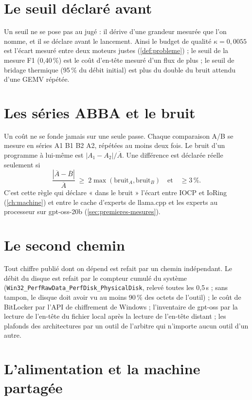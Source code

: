 \section{Le seuil déclaré avant}

Un seuil ne se pose pas au jugé : il dérive d'une grandeur mesurée que l'on nomme, et il se déclare avant le lancement. Ainsi le budget de qualité $\kappa = 0{,}0055$ est l'écart mesuré entre deux moteurs justes (\cref{def:probleme}) ; le seuil de la mesure F1 (0,40\,\%) est le coût d'en-tête mesuré d'un flux de plus ; le seuil de bridage thermique (95\,\% du débit initial) est plus du double du bruit attendu d'une GEMV répétée.

\section{Les séries ABBA et le bruit}\label{sec:protocole-abba}

Un coût ne se fonde jamais sur une seule passe. Chaque comparaison A/B se mesure en séries A1 B1 B2 A2, répétées au moins deux fois. Le bruit d'un programme à lui-même est $|A_1 - A_2|/\overline{A}$. Une différence est déclarée réelle seulement si
\[
\frac{|\overline{A} - \overline{B}|}{\overline{A}} \;\ge\; 2 \max(\text{bruit}_A, \text{bruit}_B) \quad \text{et} \quad \ge 3\,\% .
\]
C'est cette règle qui déclare « dans le bruit » l'écart entre IOCP et IoRing (\cref{ch:machine}) et entre le cache d'experts de llama.cpp et les experts au processeur sur gpt-oss-20b (\cref{sec:premieres-mesures}).

\section{Le second chemin}

Tout chiffre publié dont on dépend est refait par un chemin indépendant. Le débit du disque est refait par le compteur cumulé du système (\texttt{Win32\_PerfRawData\_PerfDisk\_PhysicalDisk}, relevé toutes les 0,5\,s ; sans tampon, le disque doit avoir vu au moins 90\,\% des octets de l'outil) ; le coût de BitLocker par l'API de chiffrement de Windows ; l'inventaire de gpt-oss par la lecture de l'en-tête du fichier local après la lecture de l'en-tête distant ; les plafonds des architectures par un outil de l'arbitre qui n'importe aucun outil d'un autre.

\section{L'alimentation et la machine partagée}\label{sec:protocole-alimentation}

